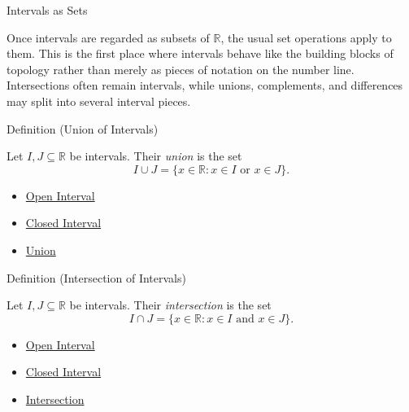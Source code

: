 \begin{topicbox}{Intervals as Sets}
\begin{exposition}
Once intervals are regarded as subsets of $\mathbb{R}$, the usual set
operations apply to them. This is the first place where intervals behave like
the building blocks of topology rather than merely as pieces of notation on
the number line. Intersections often remain intervals, while unions,
complements, and differences may split into several interval pieces.
\end{exposition}
\end{topicbox}

\begin{definitionbox}{Definition (Union of Intervals)}
\begin{definition}
\label{def:union-of-intervals}
Let $I,J\subseteq\mathbb{R}$ be intervals. Their \emph{union} is the set
\[
I\cup J=\{x\in\mathbb{R}:x\in I\text{ or }x\in J\}.
\]
\end{definition}
\end{definitionbox}

\begin{dependencies}
\begin{itemize}
  \item \hyperref[def:open-interval]{Open Interval}
  \item \hyperref[def:closed-interval]{Closed Interval}
  \item \hyperref[def:union]{Union}
\end{itemize}
\end{dependencies}

\begin{definitionbox}{Definition (Intersection of Intervals)}
\begin{definition}
\label{def:intersection-of-intervals}
Let $I,J\subseteq\mathbb{R}$ be intervals. Their \emph{intersection} is the set
\[
I\cap J=\{x\in\mathbb{R}:x\in I\text{ and }x\in J\}.
\]
\end{definition}
\end{definitionbox}

\begin{dependencies}
\begin{itemize}
  \item \hyperref[def:open-interval]{Open Interval}
  \item \hyperref[def:closed-interval]{Closed Interval}
  \item \hyperref[def:intersection]{Intersection}
\end{itemize}
\end{dependencies}

